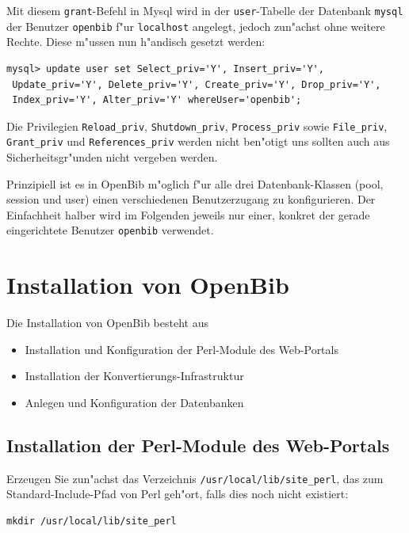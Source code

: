 \documentclass[11pt, twoside, a4paper, BCOR8mm, DIV12, bibtotoc,idxtotoc]{scrbook}
\begin{document}
Mit diesem \texttt{grant}-Befehl in Mysql wird in der
\texttt{user}-Tabelle der Datenbank \texttt{mysql} der Benutzer
\texttt{openbib} f"ur \texttt{localhost} angelegt, jedoch zun"achst
ohne weitere Rechte. Diese m"ussen nun h"andisch gesetzt werden:

\begin{verbatim}
mysql> update user set Select_priv='Y', Insert_priv='Y',
 Update_priv='Y', Delete_priv='Y', Create_priv='Y', Drop_priv='Y', 
 Index_priv='Y', Alter_priv='Y' whereUser='openbib';
\end{verbatim}

Die Privilegien \texttt{Reload\_priv}, \texttt{Shutdown\_priv},
\texttt{Process\_priv} sowie \texttt{File\_priv}, \texttt{Grant\_priv}
und \texttt{References\_priv} werden nicht ben"otigt uns sollten auch
aus Sicherheitsgr"unden nicht vergeben werden.

Prinzipiell ist es in OpenBib m"oglich f"ur alle drei
Datenbank-Klassen (pool, session und user) einen verschiedenen
Benutzerzugang zu konfigurieren. Der Einfachheit halber wird im
Folgenden jeweils nur einer, konkret der gerade eingerichtete Benutzer
\texttt{openbib} verwendet.

\chapter{Installation von OpenBib}

Die Installation von OpenBib besteht aus

\begin{itemize}
\item Installation und Konfiguration der Perl-Module des Web-Portals
\item Installation der Konvertierungs-Infrastruktur
\item Anlegen und Konfiguration der Datenbanken
\end{itemize}

\section{Installation der Perl-Module des Web-Portals}

Erzeugen Sie zun"achst das Verzeichnis \texttt{/usr/local/lib/site\_perl}, das
zum Standard-Include-Pfad von Perl geh"ort, falls dies noch nicht
existiert:

\begin{verbatim}
mkdir /usr/local/lib/site_perl
\end{verbatim}
\end{document}

